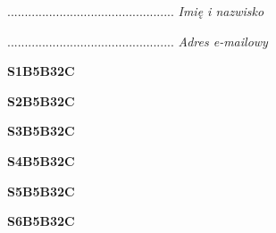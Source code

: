\begin{turn}{90}\begin{minipage}{\linewidth} \vspace{20mm} ................................................  \textit{Imię i nazwisko}\end{minipage}\end{turn}

\begin{turn}{90}\begin{minipage}{\linewidth} \vspace{20mm} ................................................  \textit{Adres e-mailowy}\end{minipage}\end{turn}

\begin{turn}{90}\huge \begin{minipage}{\linewidth} \vspace{10mm}\textbf{S1B5B32C}\end{minipage}\end{turn}

\begin{turn}{90}\huge \begin{minipage}{\linewidth} \vspace{10mm}\textbf{S2B5B32C}\end{minipage}\end{turn}

\begin{turn}{90}\huge \begin{minipage}{\linewidth} \vspace{10mm}\textbf{S3B5B32C}\end{minipage}\end{turn}

\begin{turn}{90}\huge \begin{minipage}{\linewidth} \vspace{10mm}\textbf{S4B5B32C}\end{minipage}\end{turn}

\begin{turn}{90}\huge \begin{minipage}{\linewidth} \vspace{10mm}\textbf{S5B5B32C}\end{minipage}\end{turn}

\begin{turn}{90}\huge \begin{minipage}{\linewidth} \vspace{10mm}\textbf{S6B5B32C}\end{minipage}\end{turn}

